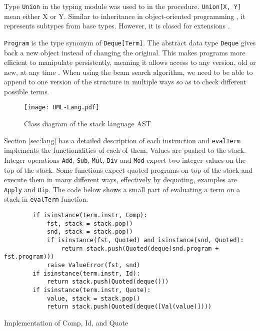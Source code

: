 Type \texttt{Union} in the typing module \cite{typing} was used to in the procedure. \texttt{Union[X, Y]} mean either X or Y. Similar to inheritance \cite{wiki:inheritance} in object-oriented programming \cite{wiki:oop}, it represents subtypes from base types. However, it is closed for extensions \cite{wiki:open-closed}.

\texttt{Program} is the type synonym of \texttt{Deque[Term]}. The abstract data type \texttt{Deque} gives back a new object instead of changing the original. This makes programs more efficient to manipulate persistently, meaning it allows access to any version, old or new, at any time \cite{driscoll1989making}. When using the beam search algorithm, we need to be able to append to one version of the structure in multiple ways so as to check different possible terms.

\begin{figure}[H]
    \centering
    \texttt{[image: UML-Lang.pdf]}
    \caption{Class diagram of the stack language AST}
    \label{fig:uml-lang}
\end{figure}

Section \ref{sec:lang} has a detailed description of each instruction and \texttt{evalTerm} implements the functionalities of each of them. Values are pushed to the stack. Integer operations \texttt{Add}, \texttt{Sub}, \texttt{Mul}, \texttt{Div} and \texttt{Mod} expect two integer values on the top of the stack. Some functions expect quoted programs on top of the stack and execute them in many different ways, effectively by dequoting, examples are \texttt{Apply} and \texttt{Dip}. The code below shows a small part of evaluating a term on a stack in \texttt{evalTerm} function.

\begin{listing}[H]
\begin{verbatim}
        if isinstance(term.instr, Comp):
            fst, stack = stack.pop()
            snd, stack = stack.pop()
            if isinstance(fst, Quoted) and isinstance(snd, Quoted):
                return stack.push(Quoted(deque(snd.program + fst.program)))
            raise ValueError(fst, snd)
        if isinstance(term.instr, Id):
            return stack.push(Quoted(deque()))
        if isinstance(term.instr, Quote):
            value, stack = stack.pop()
            return stack.push(Quoted(deque([Val(value)])))
\end{verbatim}
\caption{Implementation of Comp, Id, and Quote}
\end{listing}

